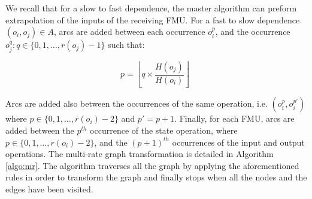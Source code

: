 We recall that for a slow to fast dependence, the master algorithm can preform extrapolation of the inputs of the receiving FMU. For a fast to slow dependence $(o_i,o_j) \in A$, arcs are added between each occurrence $o_i^p$, and the occurrence $o_j^q: q \in \{0,1, \dots ,r(o_j)-1\}$ such that:

\begin{equation}
p = \left \lfloor{q \times \frac{H(o_j)}{H(o_i)}}\right \rfloor\;
\end{equation}

Arcs are added also between the occurrences of the same operation, i.e. $(o_i^p,o_i^{p'})$ where $p \in \{0,1, \dots ,r(o_i)-2\}$ and $p' = p + 1$. Finally, for each FMU, arcs are added between the $p^{th}$ occurrence of the state operation, where $p \in \{0,1, \dots ,r(o_i)-2\}$, and the $(p+1)^{th}$ occurrences of the input and output operations. The multi-rate graph transformation is detailed in Algorithm \ref{algo:mr}. The algorithm traverses all the graph by applying the aforementioned rules in order to transform the graph and finally stops when all the nodes and the edges have been visited.

